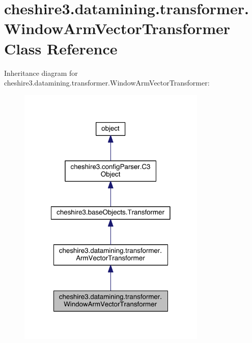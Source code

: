\hypertarget{classcheshire3_1_1datamining_1_1transformer_1_1_window_arm_vector_transformer}{\section{cheshire3.\-datamining.\-transformer.\-Window\-Arm\-Vector\-Transformer Class Reference}
\label{classcheshire3_1_1datamining_1_1transformer_1_1_window_arm_vector_transformer}
}


Inheritance diagram for cheshire3.\-datamining.\-transformer.\-Window\-Arm\-Vector\-Transformer\-:
\nopagebreak
\begin{figure}[H]
\begin{center}
\leavevmode
\includegraphics[width=254pt]{classcheshire3_1_1datamining_1_1transformer_1_1_window_arm_vector_transformer__inherit__graph}
\end{center}
\end{figure}


